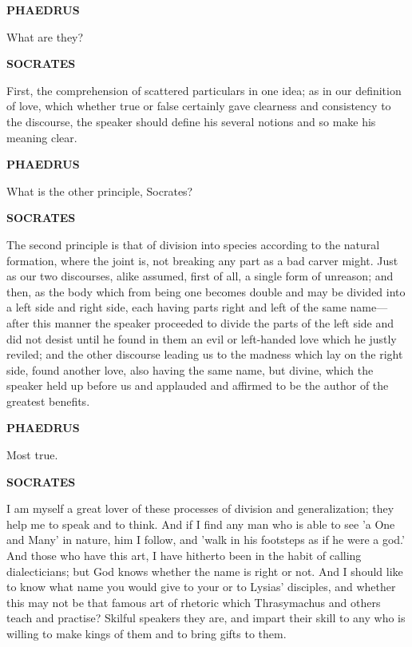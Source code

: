 \documentclass[11pt,letter]{article}
\begin{document}
\par \textbf{PHAEDRUS}
\par   What are they?

\par \textbf{SOCRATES}
\par   First, the comprehension of scattered particulars in one idea; as in our definition of love, which whether true or false certainly gave clearness and consistency to the discourse, the speaker should define his several notions and so make his meaning clear.

\par \textbf{PHAEDRUS}
\par   What is the other principle, Socrates?

\par \textbf{SOCRATES}
\par   The second principle is that of division into species according to the natural formation, where the joint is, not breaking any part as a bad carver might. Just as our two discourses, alike assumed, first of all, a single form of unreason; and then, as the body which from being one becomes double and may be divided into a left side and right side, each having parts right and left of the same name—after this manner the speaker proceeded to divide the parts of the left side and did not desist until he found in them an evil or left-handed love which he justly reviled; and the other discourse leading us to the madness which lay on the right side, found another love, also having the same name, but divine, which the speaker held up before us and applauded and affirmed to be the author of the greatest benefits.

\par \textbf{PHAEDRUS}
\par   Most true.

\par \textbf{SOCRATES}
\par   I am myself a great lover of these processes of division and generalization; they help me to speak and to think. And if I find any man who is able to see 'a One and Many' in nature, him I follow, and 'walk in his footsteps as if he were a god.' And those who have this art, I have hitherto been in the habit of calling dialecticians; but God knows whether the name is right or not. And I should like to know what name you would give to your or to Lysias' disciples, and whether this may not be that famous art of rhetoric which Thrasymachus and others teach and practise? Skilful speakers they are, and impart their skill to any who is willing to make kings of them and to bring gifts to them.
\end{document}
